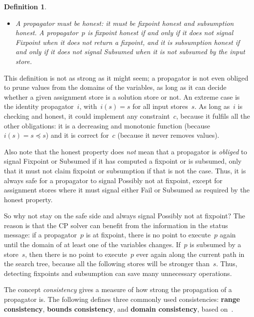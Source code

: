 \documentclass[a4paper,11pt]{article}
\newtheorem{definition}{Definition}
\newcommand{\CTpaper}[0]{DBLP:conf/cp/DemeulenaereHLP16}
\numberwithin{equation}{section}
\begin{document}
\begin{definition}
\begin{itemize}
  \item A propagator must be \emph{honest}: it must be 
    fixpoint honest and subsumption honest. 
    A propagator~$p$ is \emph{fixpoint honest} if and only if it does not signal 
    \emph{Fixpoint} when it does not return a fixpoint, and it is
    \emph{subsumption honest} if and only if it does
    not signal \emph{Subsumed} when it is not subsumed by the input store.
    
\end{itemize}

\end{definition}
This definition is not as strong as it might seem; a propagator is not even
obliged to prune values from the domains of the variables,
as long as it can decide whether a given
assignment store is a solution store or not.
An extreme case is the identity propagator~$i$, with~$i(s) = s$ for all input stores~$s$.
As long as~$i$ is checking and honest, it could implement any constraint~$c$,
because it fulfils all the other obligations: it is a decreasing and monotonic function
(because~$i(s) = s \preceq s$) and it is correct for~$c$
(because it never removes values).

Also note that the honest property does \emph{not} mean that a
propagator is \emph{obliged} to signal Fixpoint or Subsumed
if it has computed a fixpoint or is subsumed, only that it must not 
claim fixpoint or subsumption if that is not the case.
Thus, it is always safe 
for a propagator to signal Possibly not at fixpoint, except for
assignment stores where it must signal either Fail or Subsumed
as required by the honest property. 

So why not stay on the safe side and always signal Possibly not at fixpoint?
The reason is that the CP solver can benefit from the information
in the status message: if a propagator~$p$ is at fixpoint, there is no point to
execute~$p$ again until the domain of at least one of the variables changes.
If~$p$ is subsumed by a store~$s$, then there is no point to execute~$p$
ever again along the current path in the search tree, because all the following
stores will be stronger than~$s$. Thus, detecting fixpoints and subsumption
can save many unnecessary operations.

The concept \emph{consistency} gives a measure of how strong
the propagation of a propagator is.
The following defines three commonly used consistencies:
\textbf{range consistency}, \textbf{bounds consistency},
and \textbf{domain consistency}, based on~\cite{\CTpaper,Bessiere06}.
\end{document}
